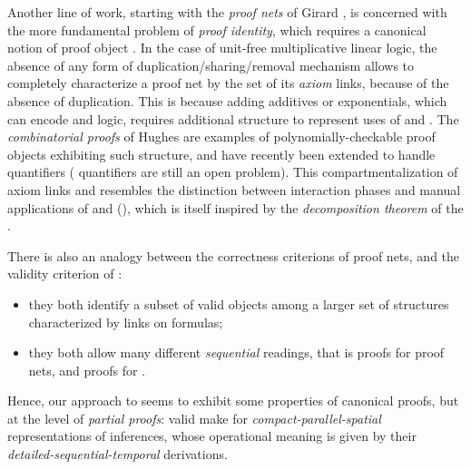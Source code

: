 Another line of work, starting with the \emph{proof nets} of Girard
, is concerned with the more fundamental problem of
\emph{proof identity}, which requires a canonical notion of proof object
. In the case of unit-free multiplicative
linear logic, the absence of any form of duplication/sharing/removal mechanism
allows to completely characterize a proof net by the set of its \emph{axiom}
links,
because of the absence of duplication. This is because adding additives or
exponentials, which can encode  and  logic, requires
additional structure to represent uses of  and . The
\emph{combinatorial proofs} of Hughes
 are examples of
polynomially-checkable proof objects exhibiting such structure, and have
recently been extended to handle   quantifiers
 ( quantifiers are still an open
problem). This compartmentalization of axiom links and 
resembles the distinction between interaction phases and manual applications of
{} and {} (), which is itself inspired by
the \emph{decomposition theorem} of the 
.

There is also an analogy between the correctness criterions of proof nets, and
the validity criterion of :
\begin{itemize}
  \item they both identify a subset of valid objects among a larger set of
  structures characterized by links on formulas;
  \item they both allow many different \emph{sequential} readings, that is
   proofs for proof nets, and  proofs for
  .
\end{itemize}
Hence, our approach to  seems to exhibit some properties of
canonical proofs, but at the level of \emph{partial proofs}: valid  make
for \emph{compact-parallel-spatial} representations of inferences, whose
operational meaning is given by their \emph{detailed-sequential-temporal} 
derivations.


